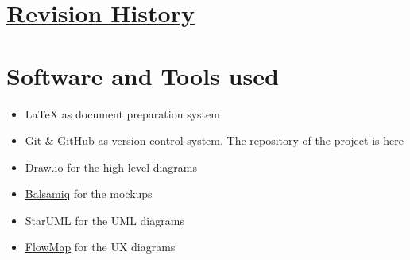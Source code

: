 \begin{appendices}
	\section[Revision History]{\hyperlink{toc}{Revision History}}
		\label{sec:revisionHistory}
		
	\section{Software and Tools used}
		\label{sec:softwareAndTools}
		
		\begin{itemize}
			\item \LaTeX{} as document preparation system
			\item Git \& \href{https://github.com/}{GitHub} as version control system. The repository of the project is \href{https://github.com/Megapiro/PaccianiPiro}{here}
			\item \href{https://www.draw.io/}{Draw.io} for the high level diagrams
			\item \href{https://balsamiq.com/}{Balsamiq} for the mockups
			\item StarUML for the UML diagrams
			\item \href{https://flowmapp.com/}{FlowMap} for the UX diagrams
		\end{itemize}		
\end{appendices}